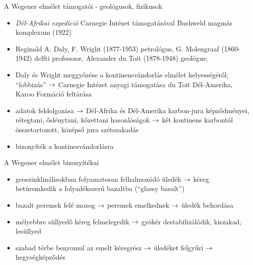 \begin{frame}{A Wegener elmélet támogatói - geológusok, fizikusok}
    \begin{itemize}
        \item \textit{Dél-Afrikai expedíció} Carnegie Intézet támogatásával Bushweld magmás komplexum (1922)
        \item Reginald A. Daly, F. Wright (1877-1953) petrológus, G. Molengraaf (1860-1942) delfti professzor, Alexander du Toit (1878-1948) geológus;
        \item Daly és Wright meggyőzése a kontinensvándorlás elmélet helyességéről; ``lobbizás'' $\rightarrow$ Carnegie Intézet anyagi támogatása du Toit Dél-Amerika, Karoo Formáció feltárása
        \item adatok feldolgozása $\rightarrow$ Dél-Afrika és Dél-Amerika karbon-jura képződményei, rétegtani, őslénytani, kőzettani hasonlóságok $\rightarrow$ két kontinens karbontól összetartozott, középső jura szétszakadás
        \item bizonyíték a kontinesvándorlásra
    \end{itemize}
\end{frame}


\begin{frame}{A Wegener elmélet bizonyítékai}
    \begin{minipage}[c]{0.525\textwidth}
    \end{minipage}
    \begin{minipage}[c]{0.45\textwidth}
        \begin{itemize}
            \item geoszinklinálisokban folyamatosan felhalmozódó üledék $\rightarrow$ kéreg betüremkedik a folyadékszerű bazaltba (``glassy basalt'')
            
        \end{itemize}
    \end{minipage}
    \begin{itemize}
        \item bazalt peremek felé mozog $\rightarrow$ peremek emelkednek $\rightarrow$ üledék behordása
        \item mélyebbre süllyedő kéreg felmelegedik $\rightarrow$ gyökér destabilizálódik, kiszakad, lesüllyed
        \item szabad térbe benyomul az emelt kéregrész $\rightarrow$ üledéket felgyűri $\rightarrow$ hegységképződés
    \end{itemize}
\end{frame}


